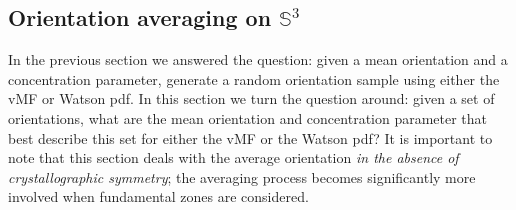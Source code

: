 \subsection{Orientation averaging on $\mathbb{S}^3$}\label{\chabbr:sec:oraverages3}
In the previous section we answered the question: given a mean orientation and a concentration parameter, generate a random orientation sample using either the vMF or Watson pdf.  In this section we turn the question around: given a set of orientations, what are the mean orientation and concentration parameter that best describe this set for either the vMF or the Watson pdf?  It is important to note that this section deals with the average orientation \textit{in the absence of crystallographic symmetry}; the averaging process becomes significantly more involved when fundamental zones are considered.

